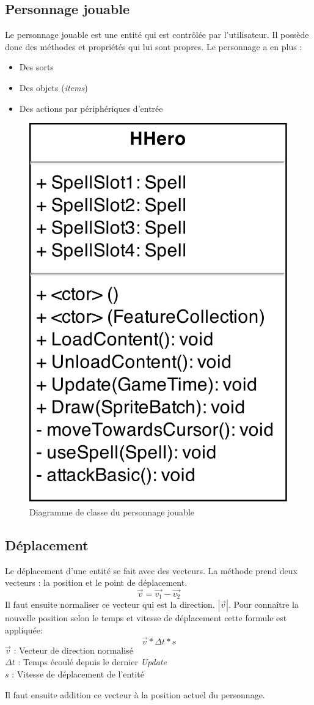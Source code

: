 \documentclass[11pt, a4paper, oneside]{report}
\begin{document}
\subsection{Personnage jouable}
Le personnage jouable est une entité qui est contrôlée par l'utilisateur. Il possède donc des méthodes et propriétés qui lui sont propres. Le personnage a en plus :
\begin{itemize}
	\item Des sorts
	\item Des objets (\textit{items})
	\item Des actions par périphériques d'entrée
\end{itemize}
\begin{figure}[h]
	\begin{center}
	\includegraphics[width=.35\textwidth]{HHero}
	\caption{Diagramme de classe du personnage jouable}
	\label{fig:HHero}
	\end{center}
\end{figure}
\subsection{Déplacement}
\label{subsubsec:deplacement}
Le déplacement d'une entité se fait avec des vecteurs. La méthode prend deux vecteurs : la position et le point de déplacement. 
$$\vec{v} = \vec{v_1} - \vec{v_2}$$
Il faut ensuite normaliser ce vecteur qui est la direction. $|\vec{v}|$. Pour connaître la nouvelle position selon le temps et vitesse de déplacement cette formule est appliquée:
$$\vec{v} * \Delta t * s$$
$\vec{v}$ : Vecteur de direction normalisé\\
$\Delta t$ : Temps écoulé depuis le dernier \textit{Update}\\
$s$ : Vitesse de déplacement de l'entité

Il faut ensuite addition ce vecteur à la position actuel du personnage.
\end{document}
